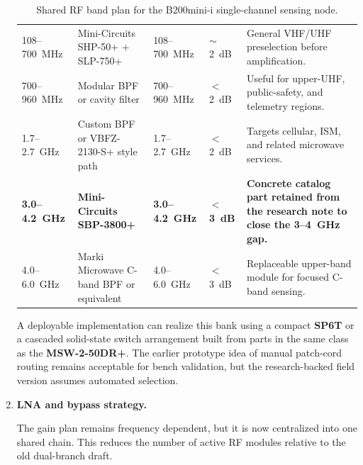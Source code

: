 \documentclass[11pt,a4paper]{article}
\begin{document}
\begin{enumerate}[label=\roman*)]
\begin{table}[htbp]
{\begin{tabular}{p{2.5cm}p{3.6cm}p{2.4cm}p{1.6cm}p{4.7cm}}
			108--700~MHz &
			Mini-Circuits SHP-50+ + SLP-750+ &
			108--700~MHz &
			$\sim$2~dB &
			General VHF/UHF preselection before amplification. \\

			700--960~MHz &
			Modular BPF or cavity filter &
			700--960~MHz &
			$<$2~dB &
			Useful for upper-UHF, public-safety, and telemetry regions. \\

			1.7--2.7~GHz &
			Custom BPF or VBFZ-2130-S+ style path &
			1.7--2.7~GHz &
			$<$2~dB &
			Targets cellular, ISM, and related microwave services. \\

			\textbf{3.0--4.2~GHz} &
			\textbf{Mini-Circuits SBP-3800+} &
			\textbf{3.0--4.2~GHz} &
			\textbf{$<$3~dB} &
			\textbf{Concrete catalog part retained from the research note to close the
				3--4~GHz gap.} \\

			4.0--6.0~GHz &
			Marki Microwave C-band BPF or equivalent &
			4.0--6.0~GHz &
			$<$3~dB &
			Replaceable upper-band module for focused C-band sensing. \\

			\bottomrule
		\end{tabular}
		}
		\caption{Shared RF band plan for the B200mini-i single-channel sensing node.}
		\label{tab:rf-band-plan}
	\end{table}

	A deployable implementation can realize this bank using a compact \textbf{SP6T}
	or a cascaded solid-state switch arrangement built from parts in the same class
	as the \textbf{MSW-2-50DR+}. The earlier prototype idea of manual patch-cord
	routing remains acceptable for bench validation, but the research-backed field
	version assumes automated selection.

	\item \textbf{LNA and bypass strategy.}

	The gain plan remains frequency dependent, but it is now centralized into one
	shared chain. This reduces the number of active RF modules relative to the old
	dual-branch draft.

	\begin{table}[!ht]
		\centering
		\small
\end{table}
\end{enumerate}
\end{document}
